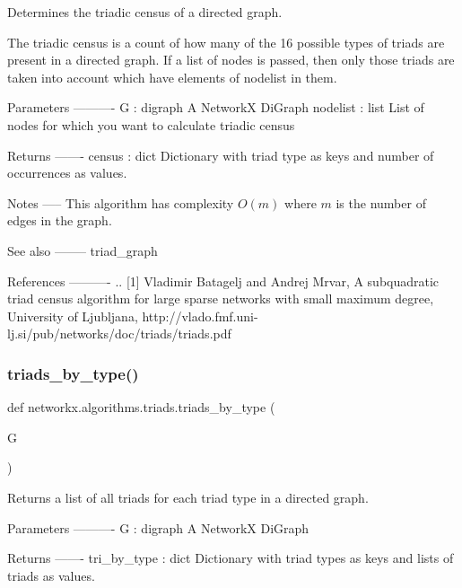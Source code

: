 \begin{DoxyVerb}Determines the triadic census of a directed graph.

The triadic census is a count of how many of the 16 possible types of
triads are present in a directed graph. If a list of nodes is passed, then
only those triads are taken into account which have elements of nodelist in them.

Parameters
----------
G : digraph
   A NetworkX DiGraph
nodelist : list
    List of nodes for which you want to calculate triadic census

Returns
-------
census : dict
   Dictionary with triad type as keys and number of occurrences as values.

Notes
-----
This algorithm has complexity $O(m)$ where $m$ is the number of edges in
the graph.

See also
--------
triad_graph

References
----------
.. [1] Vladimir Batagelj and Andrej Mrvar, A subquadratic triad census
    algorithm for large sparse networks with small maximum degree,
    University of Ljubljana,
    http://vlado.fmf.uni-lj.si/pub/networks/doc/triads/triads.pdf\end{DoxyVerb}
 \mbox{\label{namespacenetworkx_1_1algorithms_1_1triads_abe8b8e8df71b88e5d63a378f8ae03f23}} 
\subsubsection{\texorpdfstring{triads\+\_\+by\+\_\+type()}{triads\_by\_type()}}
{\footnotesize\ttfamily def networkx.\+algorithms.\+triads.\+triads\+\_\+by\+\_\+type (\begin{DoxyParamCaption}\item[{}]{G }\end{DoxyParamCaption})}

\begin{DoxyVerb}Returns a list of all triads for each triad type in a directed graph.

Parameters
----------
G : digraph
   A NetworkX DiGraph

Returns
-------
tri_by_type : dict
   Dictionary with triad types as keys and lists of triads as values.
\end{DoxyVerb}
 


